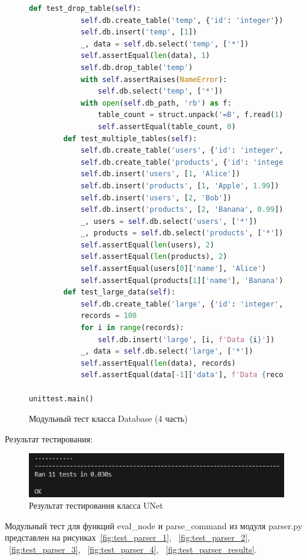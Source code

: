 \begin{figure}[H]
\begin{lstlisting}[language=Python, breaklines=true, firstnumber=111]			
		def test_drop_table(self):
			self.db.create_table('temp', {'id': 'integer'})
			self.db.insert('temp', [1])			
			_, data = self.db.select('temp', ['*'])
			self.assertEqual(len(data), 1)			
			self.db.drop_table('temp')			
			with self.assertRaises(NameError):
				self.db.select('temp', ['*'])			
			with open(self.db_path, 'rb') as f:
				table_count = struct.unpack('=B', f.read(1))[0]
				self.assertEqual(table_count, 0)				
		def test_multiple_tables(self):
			self.db.create_table('users', {'id': 'integer', 'name': 'string'})
			self.db.create_table('products', {'id': 'integer', 'name': 'string', 'price': 'float'})			
			self.db.insert('users', [1, 'Alice'])
			self.db.insert('products', [1, 'Apple', 1.99])
			self.db.insert('users', [2, 'Bob'])
			self.db.insert('products', [2, 'Banana', 0.99])			
			_, users = self.db.select('users', ['*'])
			_, products = self.db.select('products', ['*'])			
			self.assertEqual(len(users), 2)
			self.assertEqual(len(products), 2)
			self.assertEqual(users[0]['name'], 'Alice')
			self.assertEqual(products[1]['name'], 'Banana')			
		def test_large_data(self):
			self.db.create_table('large', {'id': 'integer', 'data': 'string'})
			records = 100
			for i in range(records):
				self.db.insert('large', [i, f'Data {i}'])			
			_, data = self.db.select('large', ['*'])
			self.assertEqual(len(data), records)
			self.assertEqual(data[-1]['data'], f'Data {records-1}')			

unittest.main()
\end{lstlisting}  
\caption{Модульный тест класса Database (4 часть)}
\label{fig:test_db_4}
\end{figure}

Результат тестирования:
\begin{figure}[H]
	\centering
	\includegraphics[width=0.7\linewidth]{images/dbtestresults}
	\caption{Результат тестирования класса UNet}
	\label{fig:dbtestresults}
\end{figure}

Модульный тест для функций eval\_node и parse\_command из модуля parser.py представлен на рисунках~\ref{fig:test_parser_1}, ~\ref{fig:test_parser_2}, ~\ref{fig:test_parser_3}, ~\ref{fig:test_parser_4}, ~\ref{fig:test_parser_results}.

